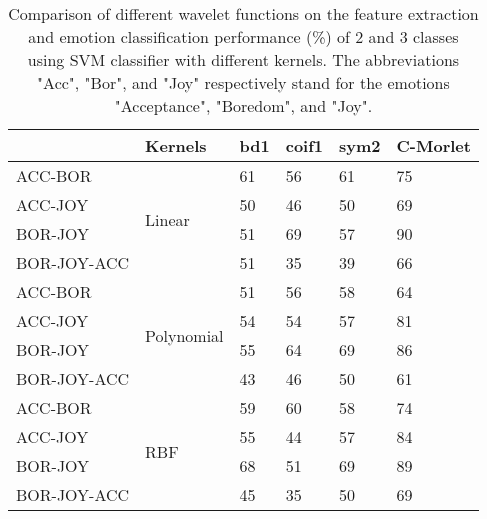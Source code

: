 \begin{table}[tbp]
	\begin{center}
	\label{edaresult}
	\begin{tabular}{llllll}
		\hline
		& Kernels                     & bd1 & coif1 & sym2 & C-Morlet \\ \hline
		ACC-BOR     & \multirow{4}{*}{Linear}     & 61  & 56    & 61   & 75       \\
		ACC-JOY     &                             & 50  & 46    & 50   & 69       \\
		BOR-JOY     &                             & 51  & 69    & 57   & 90       \\
		BOR-JOY-ACC &                             & 51  & 35    & 39   & 66       \\ \hline
		ACC-BOR     & \multirow{4}{*}{Polynomial} & 51  & 56    & 58   & 64       \\
		ACC-JOY     &                             & 54  & 54    & 57   & 81       \\
		BOR-JOY     &                             & 55  & 64    & 69   & 86       \\
		BOR-JOY-ACC &                             & 43  & 46    & 50   & 61       \\ \hline
		ACC-BOR     & \multirow{4}{*}{RBF}        & 59  & 60    & 58   & 74       \\
		ACC-JOY     &                             & 55  & 44    & 57   & 84       \\
		BOR-JOY     &                             & 68  & 51    & 69   & 89       \\
		BOR-JOY-ACC &                             & 45  & 35    & 50   & 69       \\ \hline
	\end{tabular}
\caption{Comparison of different wavelet functions on the feature extraction and emotion classification performance (\%) of 
		2 and 3 classes using SVM classifier with different kernels. The abbreviations "Acc", "Bor", and "Joy"
		respectively stand for the emotions "Acceptance", "Boredom", and "Joy".} \label{edaresult}
\end{center}
\end{table}

